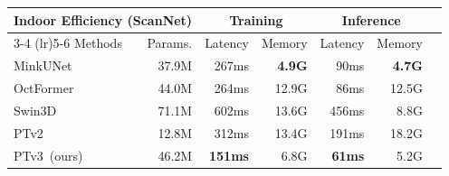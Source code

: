 \begin{tabular}{l|rrrrrr}\toprule
\multicolumn{2}{l}{Indoor Efficiency (ScanNet)} &\multicolumn{2}{c}{Training} &\multicolumn{2}{c}{Inference} \\ \cmidrule(lr){3-4} \cmidrule(lr){5-6}
Methods &Params. &Latency &Memory &Latency &Memory \\
\midrule
MinkUNet~\cite{choy20194d} &37.9M &267ms &\textbf{4.9G} &90ms &\textbf{4.7G} \\
OctFormer~\cite{Wang2023OctFormer} &44.0M &264ms &12.9G &86ms &12.5G \\
Swin3D~\cite{yang2023swin3d} &71.1M &602ms &13.6G &456ms &8.8G \\
PTv2~\cite{wu2022point} &12.8M &312ms &13.4G &191ms &18.2G \\
\cellcolor[HTML]{efefef}PTv3~(ours) &\cellcolor[HTML]{efefef}46.2M &\cellcolor[HTML]{efefef}\textbf{151ms} &\cellcolor[HTML]{efefef}6.8G &\cellcolor[HTML]{efefef}\textbf{61ms} &\cellcolor[HTML]{efefef}5.2G \\
\bottomrule
\end{tabular}
